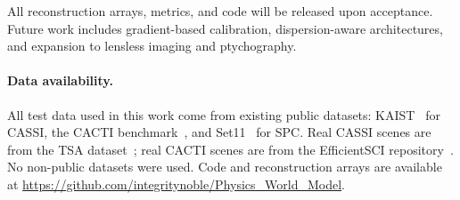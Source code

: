 \documentclass[runningheads]{llncs}
\begin{document}
All reconstruction arrays, metrics, and code will be released upon acceptance.
Future work includes gradient-based calibration, dispersion-aware architectures, and expansion to lensless imaging and ptychography.

\paragraph{Data availability.}
All test data used in this work come from existing public datasets: KAIST~\cite{choi2017kaist} for CASSI, the CACTI benchmark~\cite{yuan2021snapshot}, and Set11~\cite{kulkarni2016reconnet} for SPC. Real CASSI scenes are from the TSA dataset~\cite{wagadarikar2008cassi}; real CACTI scenes are from the EfficientSCI repository~\cite{wang2023efficientsci}. No non-public datasets were used. Code and reconstruction arrays are available at \url{https://github.com/integritynoble/Physics_World_Model}.
\end{document}
